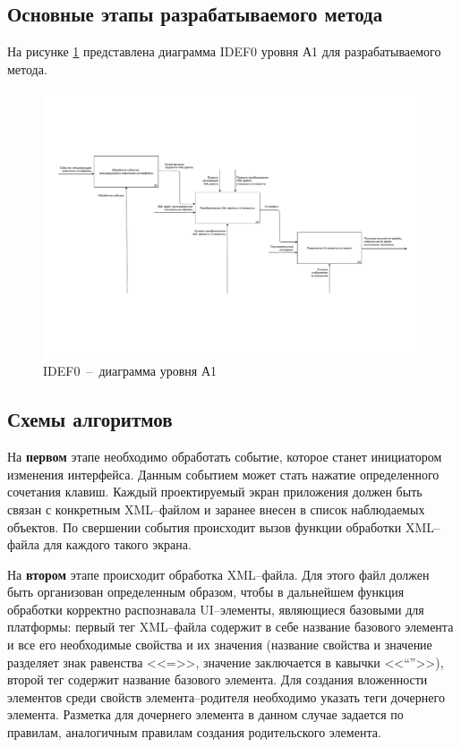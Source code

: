 \subsection{Основные этапы разрабатываемого метода}

На рисунке \ref{fig:a1} представлена диаграмма IDEF0 уровня А1 для разрабатываемого метода.

\begin{figure}[!htb]
	\centering
	\includegraphics[scale=0.4]{img/A1.pdf}
	\caption{IDEF0~--~диаграмма уровня А1}
	\label{fig:a1}
\end{figure}

\subsection{Схемы алгоритмов}

На \textbf{первом} этапе необходимо обработать событие, которое станет инициатором изменения интерфейса.
Данным событием может стать нажатие определенного сочетания клавиш.
Каждый проектируемый экран приложения должен быть связан с конкретным XML--файлом и заранее внесен в список наблюдаемых объектов. 
По свершении события происходит вызов функции обработки XML--файла для каждого такого экрана.


На \textbf{втором} этапе происходит обработка XML--файла. 
Для этого файл должен быть организован определенным образом, чтобы в дальнейшем функция обработки корректно распознавала UI--элементы, являющиеся базовыми для платформы: первый тег XML--файла содержит в себе название базового элемента и все его необходимые свойства и их значения (название свойства и значение разделяет знак равенства <<=>>, значение заключается в кавычки <<``''>>), второй тег содержит название базового элемента.
Для создания вложенности элементов среди свойств элемента--родителя необходимо указать теги дочернего элемента.
Разметка для дочернего элемента в данном случае задается по правилам, аналогичным правилам создания родительского элемента.

